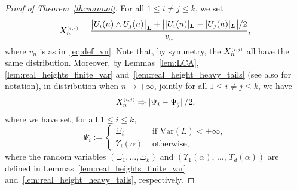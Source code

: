 \documentclass[AHL,Unicode,longabstracts,published]{cedram}
\newcommand{\bs}{\ensuremath{\boldsymbol}}
\newcommand{\sss}{\ensuremath{\scriptscriptstyle}}
\newcommand{\Var}{\mathrm{Var}}
\begin{document}
\begin{proof}[Proof of Theorem~\ref{th:voronoi}]
For all $1\leq i\neq j\leq k$, we set
\[
X^{\sss (i,j)}_n = \frac{\big|U_i(n)\wedge U_j(n)\big|_{\bs L}+\big||U_i(n)|_{\bs L} - |U_j(n)|_{\bs L}\big|/2}{v_n},
\]
where $v_n$ is as in~\eqref{eq:def_vn}. Note that, by symmetry, the $X_n^{\sss (i,j)}$ all have the same distribution. Moreover, by Lemmas~\ref{lem:LCA}, \ref{lem:real_heights_finite_var} and~\ref{lem:real_height_heavy_tails} (see also for notation), in distribution when $n\to+\infty$, jointly for all $1\leq i\neq j\leq k$, we have
\begin{equation}\label{eq:cvX}
X_n^{\sss (i,j)} \Rightarrow \left|\Psi_i-\Psi_j\right|/2,
\end{equation}
where we have set, for all $1\leq i\leq k$,
\begin{equation}\label{eq:def_Psi}
\Psi_i :=
\begin{cases}
\Xi_i& \text{ if }\Var(L)<+\infty,\\
\Upsilon_i(\alpha)&\text{ otherwise},
\end{cases}
\end{equation}
where the random variables $(\Xi_1, \ldots, \Xi_k)$ and $(\Upsilon_1(\alpha), \,\ldots,\,\Upsilon_d(\alpha))$ are defined in Lemmas~\ref{lem:real_heights_finite_var} and~\ref{lem:real_height_heavy_tails}, respectively.


\end{proof}
\end{document}
